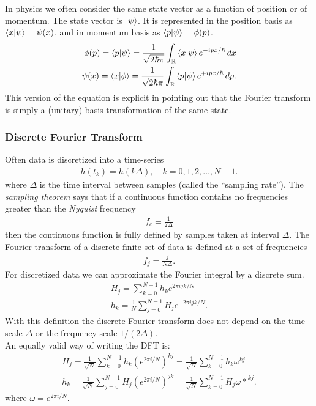 \documentclass{book}
\theoremstyle{definition}
\newcommand{\nn}{\nonumber}
\newcommand{\f}[2]{\frac{#1}{#2}}
\newcommand{\lp}{\left(}
\newcommand{\rp}{\right)}
\begin{document}
In physics we often consider the same state vector as a function of
position or of momentum. The state vector is $\ket{\psi}$. It is represented in the position basis as $\braket{x}{\psi} = \psi(x)$, and in momentum basis as $\braket{p}{\psi} = \phi(p)$. 
\begin{align}
\phi(p) = \braket{p}{\psi} = \f{1}{\sqrt{2\hbar \pi}}\int_\mathbb{R} \braket{x}{\psi}e^{-ipx/\hbar}\,dx\nn\\
\psi(x) = \braket{x}{\phi} = \f{1}{\sqrt{2\hbar \pi}}\int_\mathbb{R} \braket{p}{\psi}e^{+ipx/\hbar}\,dp. 
\end{align} 
This version of the equation is explicit in pointing out that the Fourier
transform is simply a (unitary) basis transformation of the same state. 

\subsubsection{Discrete Fourier Transform}


Often data is discretized into a time-series
\begin{align}
h(t_k) = h(k\Delta ), \quad k = 0,1,2,\dots, N-1.
\end{align}
where $\Delta$ is the time interval between samples (called the ``sampling rate''). The \textit{sampling theorem} says that if a continuous function contains no frequencies greater than the \textit{Nyquist} frequency 
\begin{align}
f_c \equiv \f{1}{2\Delta}
\end{align}
then the continuous function is fully defined by samples taken at interval $\Delta$. The
Fourier transform of a discrete finite set of data is defined at a set of frequencies
\begin{align}
f_j = \f{j}{N\Delta}.
\end{align}
For discretized data we can approximate the Fourier integral by a discrete sum. 
\begin{align}
H_j = \sum^{N-1}_{k=0} h_k e^{2\pi i jk/N}\nn\\
h_k = \f{1}{N}\sum^{N-1}_{j=0} H_j e^{-2\pi ijk /N} .
\end{align}
With this definition the discrete Fourier transform does not depend on the time
scale $\Delta$ or the frequency scale $1/(2\Delta)$. \\


An equally valid way of writing the DFT is:
\begin{align}
H_j = \f{1}{\sqrt{N}}\sum^{N-1}_{k=0} h_k \lp e^{2\pi i/N} \rp^{kj} = \f{1}{\sqrt{N}}\sum^{N-1}_{k=0}h_k \omega^{kj}\nn\\
h_k = \f{1}{\sqrt{N}}\sum^{N-1}_{j=0} H_j \lp e^{2\pi i/N} \rp^{jk} = \f{1}{\sqrt{N}}\sum^{N-1}_{k=0}H_j {\omega*}^{kj}.
\end{align}
where  $\omega = e^{2\pi i /N}$. \\
\end{document}

